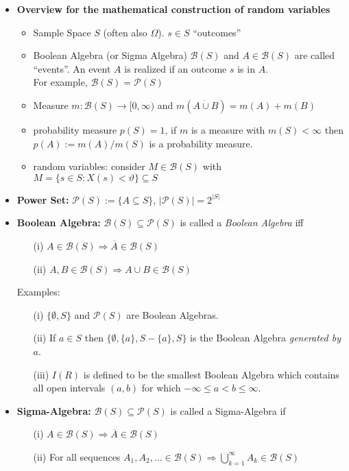 \documentclass[11pt]{article}
\begin{document}
\begin{itemize}
\item {\bf Overview for the mathematical construction of random variables}
\begin{itemize}
\item Sample Space $S$ (often also $\Omega $). $s\in S$ ``outcomes''
\item Boolean Algebra (or Sigma Algebra)  $\mathcal{B}(S)$ and $A \in \mathcal{B}(S)$ are called ``events''. An event $A$ is realized if an outcome $s$ is in $A$. \\For example, $\mathcal{B}(S)=\mathcal{P}(S)$
\item Measure $m: \mathcal{B}(S) \to [0,\infty)$ and $m(A\dot\cup B) = m(A) + m(B)$
\item probability measure $p(S)=1$, if $m$ is a measure with $m(S)<\infty$ then $p(A) := m(A)/m(S)$ is a probability measure.
\item random variables: consider $M \in \mathcal{B}(S)$ with $M=\{s \in S: X(s) < \vartheta\} \subseteq S$
\end{itemize}

\item {\bf Power Set:}  $\mathcal{P}(S) := \{A\subseteq S\}$, $|\mathcal{P}(S) |= 2^{|S|}$

\item {\bf Boolean Algebra:}  $\mathcal{B}(S) \subseteq \mathcal{P}(S)$ is called a {\it Boolean Algebra} iff
\begin{itemize}
\item[(i)] $A \in \mathcal{B}(S)  \Rightarrow \overline{A} \in \mathcal{B}(S)  $
\item[(ii)] $A, B \in \mathcal{B}(S)  \Rightarrow A \cup B \in \mathcal{B}(S)  $ 
\end{itemize}
Examples:
\begin{itemize}
\item[(i)] $\{ \emptyset, S\}  $ and $\mathcal{P}(S)$ are Boolean Algebras.
\item[(ii)] If $a\in S$ then $\{\emptyset, \{a\}, S-\{a\}, S\}$ is the Boolean Algebra {\it generated by} $a$.
\item[(iii)] $I(R)$ is defined to be the smallest Boolean Algebra which contains all open intervals $(a,b)$ for which $-\infty \le a < b\le \infty$. 
\end{itemize}

\item {\bf Sigma-Algebra:}  $\mathcal{B}(S) \subseteq \mathcal{P}(S)$ is called a Sigma-Algebra if  
\begin{itemize}
\item[(i)] $A \in \mathcal{B}(S)  \Rightarrow \overline{A} \in \mathcal{B}(S)  $
\item[(ii)] For all sequences $A_1, A_2, \dots \in \mathcal{B}(S)  \Rightarrow \bigcup_{k=1}^\infty A_k \in \mathcal{B}(S)  $ 
\end{itemize}


\end{itemize}
\end{document}
